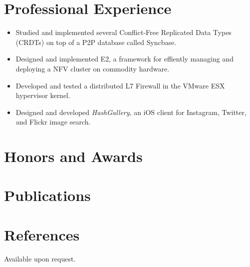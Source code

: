 \documentclass[11pt,letterpaper,sans]{moderncv}
\begin{document}
\section{Professional Experience}

 {
\begin{itemize}
\item Studied and implemented several Conflict-Free Replicated Data Types
(CRDTs) on top of a P2P database called Syncbase.
\end{itemize}
}

 {
\begin{itemize}
\item Designed and implemented E2, a framework for effiently managing and deploying a NFV cluster
on commodity hardware.
\end{itemize}
}

 {
\begin{itemize}
\item Developed and tested a distributed L7 Firewall in the VMware
ESX hypervisor kernel.
\end{itemize}
}


 {
\begin{itemize} 
\item Designed and developed \emph{HashGallery}, an iOS client for Instagram,
Twitter, and Flickr image search.
\end{itemize}
}

\section{Honors and Awards}
 {}
 {}

\section{Publications}


\section{References}
Available upon request.
\end{document}
